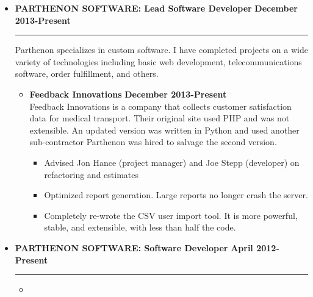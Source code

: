 \documentclass[overlapped]{res}
\begin{document}
\begin{resume}
\begin{itemize}[leftmargin=0in]
    \item[] 
        \textbf{PARTHENON SOFTWARE: Lead Software Developer} \hfill \textbf{December 2013-Present} \\[-0.1in] \rule{\textwidth}{0.5pt}
        Parthenon specializes in custom software. I have completed projects on a wide variety of technologies including basic 
        web development, telecommunications software, order fulfillment, and others. \vspace{0.125in}
        \begin{itemize}[leftmargin=0in]
            \item[] 
                \begin{samepage}
                    \textbf{Feedback Innovations} \hfill \textbf{December 2013-Present} \\
                    Feedback Innovations is a company that collects customer satisfaction data for medical transport. Their original site 
                    used PHP and was not extensible.  An updated version was written in Python and used another sub-contractor Parthenon 
                    was hired to salvage the second version.
                    \begin{itemize}
                        \item[\textbullet] Advised Jon Hance (project manager) and Joe Stepp (developer) on refactoring and estimates
                        \item[\textbullet] Optimized report generation. Large reports no longer crash the server.
                        \item[\textbullet] Completely re-wrote the CSV user import tool. It is more powerful, stable, and extensible, with
                                           less than half the code.
                    \end{itemize}
                \end{samepage}
        \end{itemize}
        \vspace{0.125in}
    \item[] 
        \textbf{PARTHENON SOFTWARE: Software Developer} \hfill \textbf{April 2012-Present} \\[-0.1in] \rule{\textwidth}{0.5pt}
        \begin{itemize}[leftmargin=0in]
            \item[] 
                \begin{samepage}

\end{samepage}
\end{itemize}
\end{itemize}
\end{resume}
\end{document}
